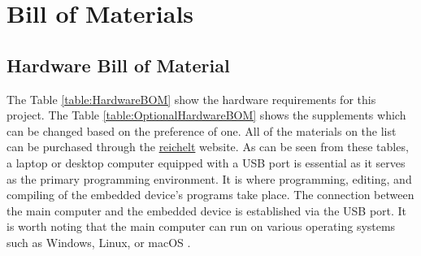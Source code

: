 %
%


\chapter{Bill of Materials}
\label{chapter:BOM}

\section{Hardware Bill of Material}

The Table \ref{table:HardwareBOM} show the hardware requirements for this project. The Table \ref{table:OptionalHardwareBOM} shows the supplements which can be changed based on the preference of one. All of the materials on the list can be purchased through the \href{https://www.reichelt.de/}{reichelt} website. As can be seen from these tables, a laptop or desktop computer equipped with a USB port is essential as it serves as the primary programming environment. It is where programming, editing, and compiling of the embedded device's programs take place. The connection between the main computer and the embedded device is established via the USB port. It is worth noting that the main computer can run on various operating systems such as Windows, Linux, or macOS \cite{Warden:2019}.

